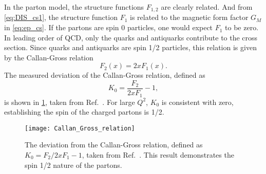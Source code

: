 \documentclass[../main.tex]{subfiles}
\begin{document}
In the parton model, the structure functions $F_{1,2}$ are clearly related. And
from \cref{eq:DIS_cs1}, the structure function $F_1$ is
related to the magnetic form factor $G_M$ in \cref{eq:ep_cs}. If the partons
are spin 0 particles, one would expect $F_1$ to be zero. In leading order of QCD,
only the quarks and antiquarks contribute to the cross section. Since quarks and
antiquarks are spin 1/2 particles, this relation is given by the Callan-Gross
relation \cite{callan1968,callan1969}
\begin{equation}
	F_2\left(x\right) = 2x F_1\left(x\right).
\end{equation}
The measured deviation of the Callan-Gross relation, defined as
\begin{equation}
	K_0 = \frac{F_2}{2xF_1}-1,
\end{equation}
is shown in \cref{fig:callan_gross}, taken from Ref.~\cite{kendall1991}.
For large $Q^2$, $K_0$ is consistent with zero, establishing the spin of the
charged partons is 1/2.
\begin{figure}[htbp!]
	\centering
	\texttt{[image: Callan\_Gross\_relation]}
	\caption{The deviation from the Callan-Gross relation, defined as
		$K_0=F_2/2xF_1 -1$, taken from Ref.~\cite{kendall1991}. This result
		demonstrates the spin 1/2 nature of the partons.}
	\label{fig:callan_gross}
\end{figure}
\end{document}
